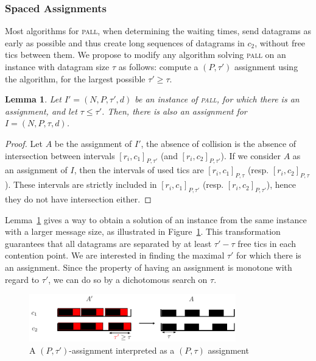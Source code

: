 \documentclass[a4paper,10pt]{journal}
\newtheorem{lemma}[theorem]{Lemma}
\newcommand\pall{\textsc{pall}\xspace}
\begin{document}
    
    
    \subsubsection{Spaced Assignments}

    Most algorithms for \pall, when determining the waiting times, send datagrams as early as possible
    and thus create long sequences of datagrams in $c_2$, without free tics between them. We propose to modify any algorithm solving \pall on an instance with datagram size $\tau$ as follows: compute a $(P,\tau')$ assignment using the algorithm, for the largest possible $\tau' \geq \tau$. 

    \begin{lemma}\label{lemma:smaller_tau}
    Let $I' = (N,P,\tau',d)$ be an instance of \pall, for which there is an assignment, and let 
    $\tau \leq \tau'$. Then, there is also an assignment for $I = (N,P,\tau,d)$.
    \end{lemma}  
    \begin{proof}
    Let $A$ be the assignment of $I'$, the absence of collision is the absence of 
    intersection between intervals $[r_i,c_1]_{P,\tau'}$ (and $[r_i,c_2]_{P,\tau'}$). 
    If we consider $A$ as an assignment of $I$, then the intervals of used tics are $[r_i,c_1]_{P,\tau}$ (resp. $[r_i,c_2]_{P,\tau}$). 
    These intervals are strictly included in $[r_i,c_1]_{P,\tau'}$ (resp. $[r_i,c_2]_{P,\tau'}$), hence they do not have intersection either. 
    \end{proof}


     Lemma~\ref{lemma:smaller_tau} gives a way to obtain a solution of an instance from the same instance with a larger message size, as illustrated in Figure~\ref{fig:space}. 
     This transformation guarantees that all datagrams are separated by at least $\tau' - \tau$ free tics in each contention point. We are interested in finding the maximal $\tau'$ for which there is an assignment. Since the property of having an assignment is monotone with regard to $\tau'$, we can do so by a dichotomous search on $\tau$.

           \begin{figure}
       \begin{center}
      \includegraphics[width = 0.8\textwidth]{space.pdf}
      \end{center} 
      \caption{A $(P,\tau')$-assignment interpreted as a $(P,\tau)$ assignment}
      \label{fig:space}   
     \end{figure}   
\end{document}
